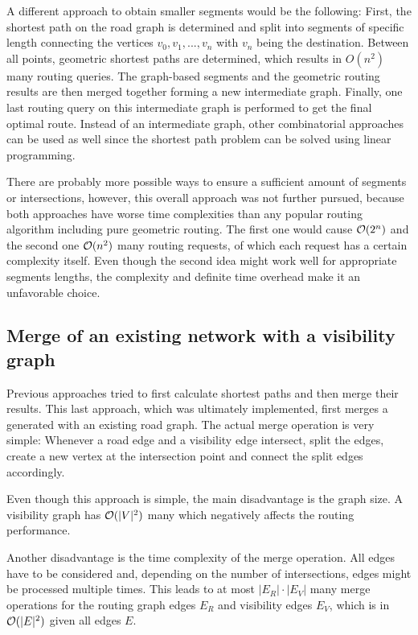 		A different approach to obtain smaller segments would be the following:
		First, the shortest path on the road graph is determined and split into segments of specific length connecting the vertices $v_0, v_1, ..., v_n$ with $v_n$ being the destination.
		Between all points, geometric shortest paths are determined, which results in $O(n^2)$ many routing queries.
		The graph-based segments and the geometric routing results are then merged together forming a new intermediate graph.
		Finally, one last routing query on this intermediate graph is performed to get the final optimal route.
		Instead of an intermediate graph, other combinatorial approaches can be used as well since the shortest path problem can be solved using linear programming\cite{handler-zang-lp-duality}.
		
		There are probably more possible ways to ensure a sufficient amount of segments or intersections, however, this overall approach was not further pursued, because both approaches have worse time complexities than any popular routing algorithm including pure geometric routing.
		The first one would cause $\mathcal{O}(2^n)$ and the second one $\mathcal{O}(n^2)$ many routing requests, of which each request has a certain complexity itself.
		Even though the second idea might work well for appropriate segments lengths, the complexity and definite time overhead make it an unfavorable choice.
	
	\subsection{Merge of an existing network with a visibility graph}
	\label{subsec:design-merge-road-network}
	
		Previous approaches tried to first calculate shortest paths and then merge their results.
		This last approach, which was ultimately implemented, first merges a generated  with an existing road graph.
		The actual merge operation is very simple:
		Whenever a road edge and a visibility edge intersect, split the edges, create a new vertex at the intersection point and connect the split edges accordingly.
		
		Even though this approach is simple, the main disadvantage is the graph size.
		A visibility graph has $\mathcal{O}(|V|^2)$ many which negatively affects the routing performance.
		
		Another disadvantage is the time complexity of the merge operation.
		All edges have to be considered and, depending on the number of intersections, edges might be processed multiple times.
		This leads to at most $|E_R| \cdot |E_V|$ many merge operations for the routing graph edges $E_R$ and visibility edges $E_V$, which is in $\mathcal{O}(|E|^2)$ given all edges $E$.
		
